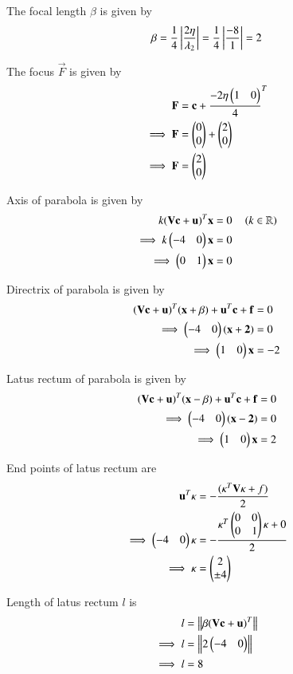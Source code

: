 \documentclass[journal,12pt,twocolumn]{IEEEtran}
\begin{document}
The focal length $\beta$ is given by
\begin{align}
\beta = \frac{1}{4}\left\vert\frac{2\eta}{\lambda_2}\right\vert = \frac{1}{4}\left\vert\frac{-8}{1}\right\vert= 2
\end{align}

The focus $\vec{F}$ is given by
\begin{align}
\mathbf{F} &= \mathbf{c} + {\frac{-2\eta\begin{pmatrix}1 & 0\end{pmatrix}}{4}}^{T} 
\\
\implies \mathbf{F} &= \begin{pmatrix}0\\0\end{pmatrix} + \begin{pmatrix}2\\0\end{pmatrix}
\\
\implies \mathbf{F} &= \begin{pmatrix}2\\0\end{pmatrix}
\end{align}

Axis of parabola is given by
\begin{align}
k(\mathbf{V}\mathbf{c}+\mathbf{u})^{T}\mathbf{x} &= 0 \quad\left(  k \in \mathbb{R}\right)
\\
\implies k\begin{pmatrix}-4 & 0\end{pmatrix}\mathbf{x} &= 0
\\
\implies \begin{pmatrix}0 & 1\end{pmatrix}\mathbf{x} &= 0
\end{align}

Directrix of parabola is given by
\begin{align}
(\mathbf{V}\mathbf{c}+\mathbf{u})^T(\mathbf{x} +\beta) + \mathbf{u}^T\mathbf{c} + \mathbf{f} &= 0
\\
\implies \begin{pmatrix}-4 & 0\end{pmatrix}(\mathbf{x+2}) &= 0
\\
\implies \begin{pmatrix}1 & 0\end{pmatrix}\mathbf{x} &= -2
\end{align}

Latus rectum of parabola is given by
\begin{align}
(\mathbf{V}\mathbf{c}+\mathbf{u})^T(\mathbf{x} -\beta) + \mathbf{u}^T\mathbf{c} + \mathbf{f} &= 0
\\
\implies \begin{pmatrix}-4 & 0\end{pmatrix}(\mathbf{x-2}) &= 0
\\
\implies \begin{pmatrix}1 & 0\end{pmatrix}\mathbf{x} &=2
\end{align}

End points of latus rectum are
\begin{align}
\mathbf{u}^T\kappa &= -\frac{(\kappa^T\mathbf{V}\kappa + f )}{2}
\\
\implies \begin{pmatrix}-4 & 0\end{pmatrix}\kappa &= -\frac{\kappa^T\begin{pmatrix}0 & 0\\0 & 1\end{pmatrix}\kappa + 0}{2}
\\
\implies \kappa &= \begin{pmatrix}2 \\ \pm 4\end{pmatrix}
\end{align}

Length of latus rectum $l$ is 
\begin{align}
l &= \left\lVert\beta(\mathbf{V}\mathbf{c}+\mathbf{u})^T\right\rVert
\\
\implies l &= \left\lVert2\begin{pmatrix}-4 & 0\end{pmatrix}\right\rVert
\\
\implies l &= 8 
\end{align}
\end{document}
